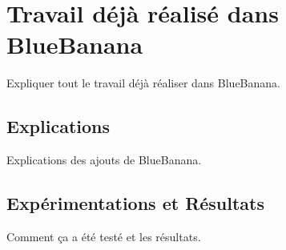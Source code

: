 \section{Travail déjà réalisé dans BlueBanana}
	\label{BlueBanana}
	Expliquer tout le travail déjà réaliser dans BlueBanana.
	\subsection{Explications}
		Explications des ajouts de BlueBanana.\\ \newline
	\subsection{Expérimentations et Résultats}
		Comment ça a été testé et les résultats.
